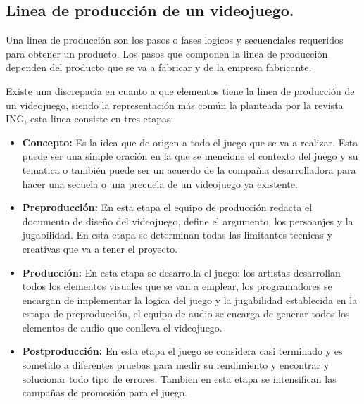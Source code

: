 	\subsection{Linea de producción de un videojuego.}\label{Pipelinevideojuego}
	Una linea de producción son los pasos o fases logicos y secuenciales requeridos para obtener un producto. Los pasos que componen la linea de producción dependen del producto que se va a fabricar y de la empresa fabricante. 
	\\
	\par	
	Existe una discrepacia en cuanto a que elementos tiene la linea de producción de un videojuego, siendo la representación más común la planteada por la revista ING, esta linea consiste en tres etapas\cite{Ref_Desarrollo}:
	\begin{itemize}
		\item \textbf{Concepto:} Es la idea que de origen a todo el juego que se va a realizar. Esta puede ser una simple oración en la que se mencione el contexto del juego y su tematica o también puede ser un acuerdo de la compañia desarrolladora para hacer una secuela o una precuela de un videojuego ya existente\cite{Ref_Desarrollo}.
		\item \textbf{Preproducción:} En esta etapa el equipo de producción redacta el documento de diseño del videojuego, define el argumento, los persoanjes y la jugabilidad. En esta etapa se determinan todas las limitantes tecnicas y creativas que va a tener el proyecto\cite{Ref_Desarrollo}.
		\item \textbf{Producción:} En esta etapa se desarrolla el juego: los artistas desarrollan todos los elementos visuales que se van a emplear, los programadores se encargan de implementar la logica del juego y la jugabilidad establecida en la estapa de preproducción, el equipo de audio se encarga de generar todos los elementos de audio que conlleva el videojuego\cite{Ref_Desarrollo}.
		\item \textbf{Postproducción:} En esta etapa el juego se considera casi terminado y es sometido a diferentes pruebas para medir su rendimiento y encontrar y solucionar todo tipo de errores. Tambien en esta etapa se intensifican las campañas de promosión para el juego\cite{Ref_Desarrollo}.
\end{itemize}	 

	
	
	
	